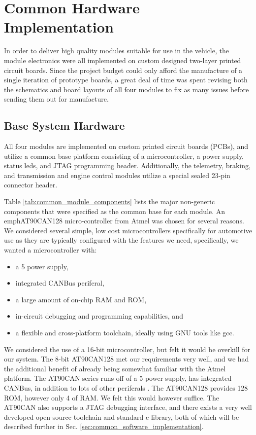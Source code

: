 \section{Common Hardware Implementation\label{sec:common_hardware_implementation}}

In order to deliver high quality modules suitable for use in the vehicle, the module electronics were all implemented on custom designed two-layer printed circuit boards. Since the project budget could only afford the manufacture of a single iteration of prototype boards, a great deal of time was spent revising both the schematics and board layouts of all four modules to fix as many issues before sending them out for manufacture.


\subsection{Base System Hardware\label{sec:base_system_hardware}}

All four modules are implemented on custom printed circuit boards (PCBs), and utilize a common base platform consisting of a microcontroller, a power supply, status leds, and JTAG programming header. Additionally, the telemetry, braking, and transmission and engine control modules utilize a special sealed 23-pin connector header.

Table \ref{tab:common_module_components} lists the major non-generic components that were specified as the common base for each module. An emph{AT90CAN128} micro-controller from Atmel was chosen for several reasons. We considered several simple, low cost microcontrollers specifically for automotive use as they are typically configured with the features we need, specifically, we wanted a microcontroller with:

\begin{itemize}
  \item a \unit{5}{\volt} power supply,
  \item integrated CANBus periferal,
  \item a large amount of on-chip RAM and ROM,
  \item in-circuit debugging and programming capabilities, and
  \item a flexible and cross-platform toolchain, ideally using GNU tools like gcc.
\end{itemize}

We considered the use of a 16-bit microcontroller, but felt it would be overkill for our system. The 8-bit AT90CAN128 met our requirements very well, and we had the additional benefit of already being somewhat familiar with the Atmel platform. The AT90CAN series runs off of a \unit{5}{\volt} power supply, has integrated CANBus, in addition to lots of other periferals \cite{AT90CAN}. The AT90CAN128 provides \unit{128}{\kilo\byte} ROM, however only \unit{4}{\kilo\byte} of RAM. We felt this would however suffice. The AT90CAN also supports a JTAG debugging interface, and there exists a very well developed open-source toolchain and standard c library, both of which will be described further in Sec. \ref{sec:common_software_implementation}.

